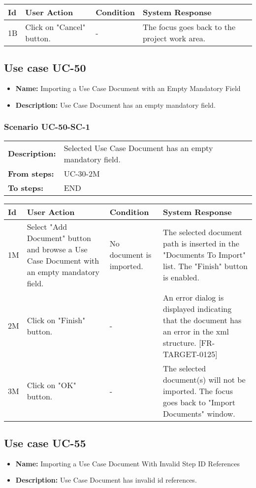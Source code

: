 \documentclass[a4paper,11pt]{article}
\newcommand{\bl}{\\ \hline}
\begin{document}
\begin{tabular}{|p{0.8in}|p{1.6in}|p{1.6in}|p{1.6in}|}
\hline
Id & User Action & Condition & System Response  \bl 
1B & Click on "Cancel" button. & - & The focus goes back to the project work area. \bl 
\end{tabular}
\subsection*{Use case UC-50}
\begin{itemize}
\item {\bf Name: }Importing a Use Case Document with an Empty Mandatory Field
\item {\bf Description: }Use Case Document has an empty mandatory field.
\end{itemize}
\subsubsection*{Scenario UC-50-SC-1}
\begin{tabular}{p{1in}p{4in}}
{\bf Description:} & Selected Use Case Document has an empty mandatory field. \\
{\bf From steps:} & UC-30-2M \\
{\bf To steps:} & END \\
\end{tabular}
 
\begin{tabular}{|p{0.8in}|p{1.6in}|p{1.6in}|p{1.6in}|}
\hline
Id & User Action & Condition & System Response  \bl 
1M & Select "Add Document" button and browse a Use Case Document with an empty mandatory field. & No document is imported. & The selected document path is inserted in the "Documents To Import" list. The "Finish" button is enabled. \bl 
2M & Click on "Finish" button. & - & An error dialog is displayed indicating that the document has an error in the xml structure. [FR-TARGET-0125] \bl 
3M & Click on "OK" button. & - & The selected document(s) will not be imported. The focus goes back to "Import Documents" window. \bl 
\end{tabular}
\subsection*{Use case UC-55}
\begin{itemize}
\item {\bf Name: }Importing a Use Case Document With Invalid Step ID References
\item {\bf Description: }Use Case Document has invalid id references.
\end{itemize}
\end{document}
